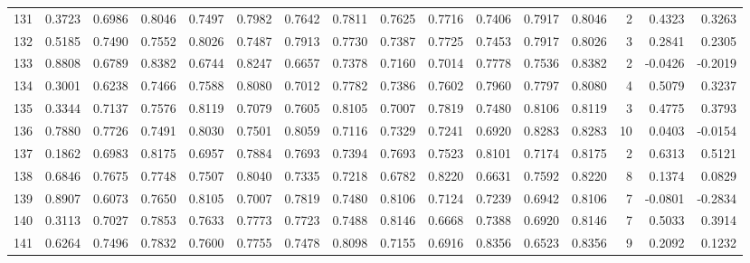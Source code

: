\begin{tabular}{lrrrrrrrrrrrrrrr}
131 &      0.3723 &  0.6986 &  0.8046 &  0.7497 &  0.7982 &  0.7642 &  0.7811 &  0.7625 &  0.7716 &  0.7406 &   0.7917 &     0.8046 &      2 &                    0.4323 &                     0.3263 \\
132 &      0.5185 &  0.7490 &  0.7552 &  0.8026 &  0.7487 &  0.7913 &  0.7730 &  0.7387 &  0.7725 &  0.7453 &   0.7917 &     0.8026 &      3 &                    0.2841 &                     0.2305 \\
133 &      0.8808 &  0.6789 &  0.8382 &  0.6744 &  0.8247 &  0.6657 &  0.7378 &  0.7160 &  0.7014 &  0.7778 &   0.7536 &     0.8382 &      2 &                   -0.0426 &                    -0.2019 \\
134 &      0.3001 &  0.6238 &  0.7466 &  0.7588 &  0.8080 &  0.7012 &  0.7782 &  0.7386 &  0.7602 &  0.7960 &   0.7797 &     0.8080 &      4 &                    0.5079 &                     0.3237 \\
135 &      0.3344 &  0.7137 &  0.7576 &  0.8119 &  0.7079 &  0.7605 &  0.8105 &  0.7007 &  0.7819 &  0.7480 &   0.8106 &     0.8119 &      3 &                    0.4775 &                     0.3793 \\
136 &      0.7880 &  0.7726 &  0.7491 &  0.8030 &  0.7501 &  0.8059 &  0.7116 &  0.7329 &  0.7241 &  0.6920 &   0.8283 &     0.8283 &     10 &                    0.0403 &                    -0.0154 \\
137 &      0.1862 &  0.6983 &  0.8175 &  0.6957 &  0.7884 &  0.7693 &  0.7394 &  0.7693 &  0.7523 &  0.8101 &   0.7174 &     0.8175 &      2 &                    0.6313 &                     0.5121 \\
138 &      0.6846 &  0.7675 &  0.7748 &  0.7507 &  0.8040 &  0.7335 &  0.7218 &  0.6782 &  0.8220 &  0.6631 &   0.7592 &     0.8220 &      8 &                    0.1374 &                     0.0829 \\
139 &      0.8907 &  0.6073 &  0.7650 &  0.8105 &  0.7007 &  0.7819 &  0.7480 &  0.8106 &  0.7124 &  0.7239 &   0.6942 &     0.8106 &      7 &                   -0.0801 &                    -0.2834 \\
140 &      0.3113 &  0.7027 &  0.7853 &  0.7633 &  0.7773 &  0.7723 &  0.7488 &  0.8146 &  0.6668 &  0.7388 &   0.6920 &     0.8146 &      7 &                    0.5033 &                     0.3914 \\
141 &      0.6264 &  0.7496 &  0.7832 &  0.7600 &  0.7755 &  0.7478 &  0.8098 &  0.7155 &  0.6916 &  0.8356 &   0.6523 &     0.8356 &      9 &                    0.2092 &                     0.1232 \\

\end{tabular}

